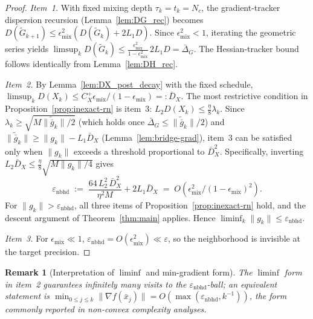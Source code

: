 \documentclass[11pt,a4paper]{article}
\def\cO{O}%
\newtheorem{remark}[theorem]{Remark}
\newcommand{\cO}{\mathcal{O}}
\begin{document}
\begin{proof}
\emph{Item~1.}
With fixed mixing depth $\tau_k=t_k=N_c$, the gradient-tracker
dispersion recursion (Lemma~\ref{lem:DG_rec}) becomes
$D(\tilde G_{k+1})\le\epsilon_{\mathrm{mix}}^2(D(\tilde G_k)+2L_1D)$.
Since $\epsilon_{\mathrm{mix}}^2<1$, iterating the geometric series yields
$\limsup_{k}D(\tilde G_k)\le \frac{\epsilon_{\mathrm{mix}}^2}{1-\epsilon_{\mathrm{mix}}^2}\,2L_1D
=\bar\Delta_G$.
The Hessian-tracker bound follows identically from Lemma~\ref{lem:DH_rec}.

\emph{Item~2.}
By Lemma~\ref{lem:DX_post_decay} with the fixed schedule,
$\limsup_k D(X_k)\le C_X^{+}\epsilon_{\mathrm{mix}}/(1-\epsilon_{\mathrm{mix}})=:\bar D_X$.
The most restrictive condition in Proposition~\ref{prop:inexact-rn}
is item~3: $L_2 D(X_k)\le\frac{\eta}{8}\lambda_k$.
Since $\lambda_k\ge\sqrt{M\|\tilde{\bar g}_k\|/2}$
(which holds once $\bar\Delta_G\le\|\tilde{\bar g}_k\|/2$) and
$\|\tilde{\bar g}_k\|\ge\|g_k\|-L_1\bar D_X$
(Lemma~\ref{lem:bridge-grad}), item~3 can be satisfied only when
$\|g_k\|$ exceeds a threshold proportional to $\bar D_X^2$.
Specifically, inverting $L_2\bar D_X\le\frac{\eta}{8}\sqrt{M\|g_k\|/4}$
gives
\[
\varepsilon_{\mathrm{nbhd}}
\;:=\;
\frac{64\,L_2^2\,\bar D_X^2}{\eta^2 M}
+2L_1\bar D_X
\;=\;\cO(\epsilon_{\mathrm{mix}}^2/(1{-}\epsilon_{\mathrm{mix}})^2).
\]
For $\|g_k\|>\varepsilon_{\mathrm{nbhd}}$, all three items of
Proposition~\ref{prop:inexact-rn} hold, and the descent
argument of Theorem~\ref{thm:main} applies.
Hence $\liminf_k\|g_k\|\le\varepsilon_{\mathrm{nbhd}}$.

\emph{Item~3.}
For $\epsilon_{\mathrm{mix}}\ll 1$,
$\varepsilon_{\mathrm{nbhd}}=\cO(\epsilon_{\mathrm{mix}}^2)\ll\varepsilon$,
so the neighborhood is invisible at the target precision.
\end{proof}

\begin{remark}[Interpretation of $\liminf$ and min-gradient form]
The $\liminf$ form in item~2 guarantees infinitely many visits to
the $\varepsilon_{\mathrm{nbhd}}$-ball; an equivalent statement is
$\min_{0\le j\le k}\|\nabla f(\bar x_j)\|
=\cO(\max(\varepsilon_{\mathrm{nbhd}}, k^{-1}))$,
the form commonly reported in non-convex complexity analyses.
\end{remark}
\end{document}
